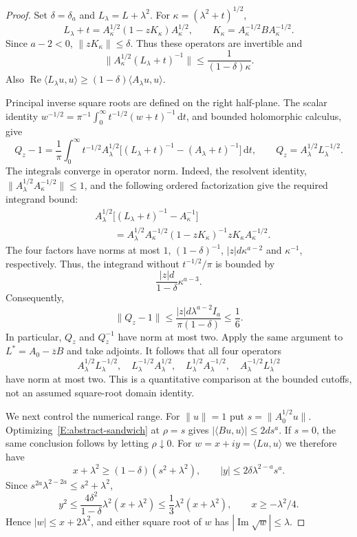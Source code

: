 \documentclass[12pt]{article}
\numberwithin{equation}{section}
\theoremstyle{definition}
\newcommand{\ud}{\,\mathrm{d}}
\begin{document}
\begin{proof}
  Set $\delta=\delta_a$ and $L_\lambda=L+\lambda^2$.
  For $\kappa=(\lambda^2+t)^{1/2}$,
  \[
    L_\lambda+t
    =A_\kappa^{1/2}(1-zK_\kappa)A_\kappa^{1/2},\qquad
    K_\kappa=A_\kappa^{-1/2}BA_\kappa^{-1/2}.
  \]
  Since $a-2<0$, $\|zK_\kappa\|\le\delta$. Thus these operators are
  invertible and
  \[
    \|A_\kappa^{1/2}(L_\lambda+t)^{-1}\|
    \le\frac1{(1-\delta)\kappa}.
  \]
  Also $\operatorname{Re}\langle L_\lambda u,u\rangle
  \ge(1-\delta)\langle A_\lambda u,u\rangle$.

  Principal inverse square roots are defined on the right half-plane.
  The scalar identity
  $w^{-1/2}=\pi^{-1}\int_0^\infty t^{-1/2}(w+t)^{-1}\ud t$,
  and bounded holomorphic calculus, give
  \[
    Q_z-1
    =\frac1\pi\int_0^\infty t^{-1/2}A_\lambda^{1/2}
    \big[(L_\lambda+t)^{-1}-(A_\lambda+t)^{-1}\big]\ud t,
    \qquad Q_z=A_\lambda^{1/2}L_\lambda^{-1/2}.
  \]
  The integrals converge in operator norm. Indeed, the resolvent
  identity, $\|A_\lambda^{1/2}A_\kappa^{-1/2}\|\le1$, and the
  following ordered factorization give the required integrand bound:
  \[
    \begin{split}
      &A_\lambda^{1/2}
      \big[(L_\lambda+t)^{-1}-A_\kappa^{-1}\big]\\
      &\qquad=A_\lambda^{1/2}A_\kappa^{-1/2}
      (1-zK_\kappa)^{-1}zK_\kappa A_\kappa^{-1/2}.
    \end{split}
  \]
  The four factors have norms at most $1$, $(1-\delta)^{-1}$,
  $|z|d\kappa^{a-2}$ and $\kappa^{-1}$, respectively.
  Thus, the integrand without $t^{-1/2}/\pi$ is bounded by
  \[
    \frac{|z|d}{1-\delta}\kappa^{a-3}.
  \]
  Consequently,
  \[
    \|Q_z-1\|
    \le\frac{|z|d\lambda^{a-2}I_a}{\pi(1-\delta)}
    \le\frac16.
  \]
  In particular, $Q_z$ and $Q_z^{-1}$ have norm at most two.
  Apply the same argument to $L^*=A_0-\overline zB$ and take adjoints.
  It follows that all four operators
  \begin{equation}\label{E:phase-root-comparisons}
    A_\lambda^{1/2}L_\lambda^{-1/2},\quad
    L_\lambda^{-1/2}A_\lambda^{1/2},\quad
    L_\lambda^{1/2}A_\lambda^{-1/2},\quad
    A_\lambda^{-1/2}L_\lambda^{1/2}
  \end{equation}
  have norm at most two. This is a quantitative comparison at the
  bounded cutoffs, not an assumed square-root domain identity.

  We next control the numerical range. For $\|u\|=1$ put
  $s=\|A_0^{1/2}u\|$. Optimizing~\eqref{E:abstract-sandwich} at
  $\rho=s$ gives $|\langle Bu,u\rangle|\le2ds^a$.
  If $s=0$, the same conclusion follows by letting $\rho\downarrow0$.
  For $w=x+iy=\langle Lu,u\rangle$ we therefore have
  \[
    x+\lambda^2\ge(1-\delta)(s^2+\lambda^2),\qquad
    |y|\le2\delta\lambda^{2-a}s^a.
  \]
  Since $s^{2a}\lambda^{2-2a}\le s^2+\lambda^2$,
  \[
    y^2\le\frac{4\delta^2}{1-\delta}\lambda^2(x+\lambda^2)
    \le\frac13\lambda^2(x+\lambda^2),\qquad
    x\ge-\lambda^2/4.
  \]
  Hence $|w|\le x+2\lambda^2$, and either square root of $w$ has
  $|\operatorname{Im}\sqrt w|\le\lambda$.


\end{proof}
\end{document}
